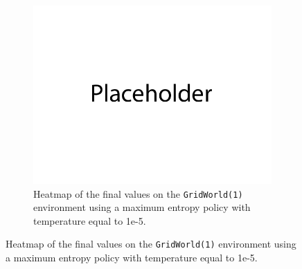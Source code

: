 \documentclass{article}
\begin{document}
\begin{enumerate}[(a)]
\begin{figure}[h!]
\begin{subfigure}{0.3\textwidth}
    \end{subfigure}
    \hspace{0.1 in}
     \begin{subfigure}{0.3\textwidth}
        \centering
        \includegraphics[width=\textwidth]{figures/placeholder.png}
        \caption{Heatmap of the final values on the \texttt{GridWorld(1)} environment using a maximum entropy policy with temperature equal to 1e-5.}
    \end{subfigure}
\end{figure}


\end{enumerate}



\newpage 
{}
\end{document}
